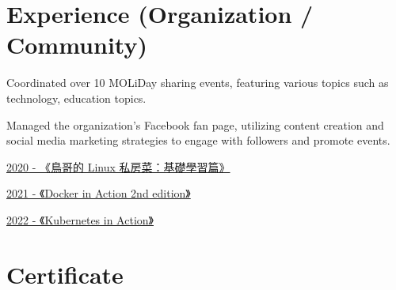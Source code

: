 \documentclass[]{deedy-resume-openfont}
\begin{document}
\hfill
\begin{minipage}[t]{1\textwidth}


\section{Experience (Organization / Community)}
\null\hfill{}
\vspace{\topsep}
\begin{tightemize}
    \item Coordinated over 10 MOLiDay sharing events, featuring various topics such as technology, education topics.
    \item Managed the organization's Facebook fan page, utilizing content creation and social media marketing strategies to engage with followers and promote events.
\end{tightemize}
\hspace{12pt}
\sectionsep


\null\hfill{}
\begin{tightemize}
    \item {}\href{https://lsa.moli.rocks/study-circle/docs/2020-11-07}{2020 - 《鳥哥的 Linux 私房菜：基礎學習篇》}
    \item {}\href{https://lsa.moli.rocks/study-circle/docs/docker-1}{2021 - 《Docker in Action 2nd edition》}
    \item {}\href{https://lsa.moli.rocks/study-circle/docs/k8s-1}{2022 - 《Kubernetes in Action》}
\end{tightemize}
\sectionsep


\section{Certificate}

\null\hfill{}
\null\hfill{}


\end{minipage}
\end{document}
